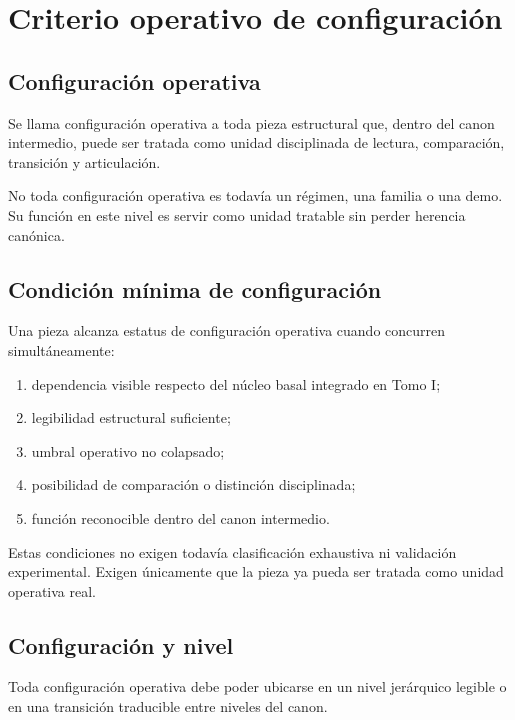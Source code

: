 \chapter{Criterio operativo de configuración}

\section{Configuración operativa}
\begin{definition}
Se llama configuración operativa a toda pieza estructural que, dentro del canon intermedio, puede ser tratada como unidad disciplinada de lectura, comparación, transición y articulación.
\end{definition}

\begin{observation}
No toda configuración operativa es todavía un régimen, una familia o una demo. Su función en este nivel es servir como unidad tratable sin perder herencia canónica.
\end{observation}

\section{Condición mínima de configuración}
\begin{definition}
Una pieza alcanza estatus de configuración operativa cuando concurren simultáneamente:
\begin{enumerate}
  \item dependencia visible respecto del núcleo basal integrado en Tomo I;
  \item legibilidad estructural suficiente;
  \item umbral operativo no colapsado;
  \item posibilidad de comparación o distinción disciplinada;
  \item función reconocible dentro del canon intermedio.
\end{enumerate}
\end{definition}

\begin{observation}
Estas condiciones no exigen todavía clasificación exhaustiva ni validación experimental. Exigen únicamente que la pieza ya pueda ser tratada como unidad operativa real.
\end{observation}

\section{Configuración y nivel}
\begin{definition}
Toda configuración operativa debe poder ubicarse en un nivel jerárquico legible o en una transición traducible entre niveles del canon.
\end{definition}

